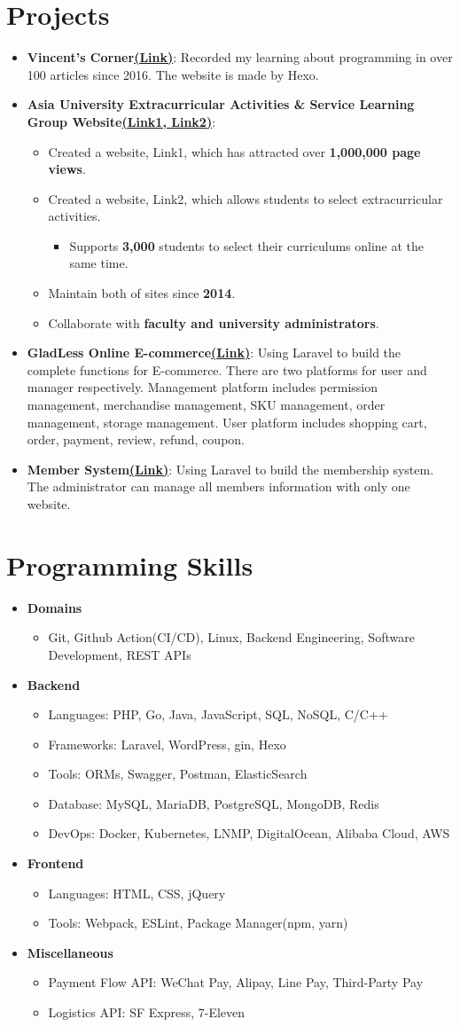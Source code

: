 \documentclass[letterpaper,11pt]{article}
\newcommand{\resumeItem}[2]{
  \item{
    \textbf{#1}{: #2 \vspace{-2pt}}
  }
}
\newcommand{\keyItem}[1]{
  \item {
      {#1 \vspace{-2pt}}
  }
}
\newcommand{\keyResultItem}[2]{
  \item {
    {#1 \vspace{-2pt}}
    \begin{itemize}
      \item {#2 \vspace{-2pt}}
    \end{itemize}
  }
}
\newcommand{\resumeSubItem}[2]{\resumeItem{#1}{#2}\vspace{-4pt}}
\newcommand{\resumeSubHeadingListStart}{\begin{itemize}[leftmargin=*]}
\newcommand{\resumeSubHeadingListEnd}{\end{itemize}}
\newcommand{\resumeItemListStart}{\begin{itemize}}
\newcommand{\resumeItemListEnd}{\end{itemize}\vspace{-5pt}}
\begin{document}
\section{Projects}
  \resumeSubHeadingListStart
    \resumeSubItem{Vincent's Corner\href{https://vincent.fishboneapps.com/}{(\underline{Link})}}
      {Recorded my learning about programming in over 100 articles since 2016. The website is made by Hexo.}
    \resumeSubItem{Asia University Extracurricular Activities \& Service Learning Group Website\href{https://sls.asia.edu.tw/}{(\underline{Link1}, }\href{https://elective.easls.asia/}{\underline{Link2})}}
      {}
      \resumeItemListStart
        \keyItem{Created a website, Link1, which has attracted over \textbf{1,000,000 page views}.}
        \keyResultItem{Created a website, Link2, which allows students to select extracurricular activities.}{Supports \textbf{3,000} students to select their curriculums online at the same time.}
        \keyItem{Maintain both of sites since \textbf{2014}.}
        \keyItem{Collaborate with \textbf{faculty and university administrators}.}
      \resumeItemListEnd
    \resumeSubItem{GladLess Online E-commerce\href{https://gladless.com/}{(\underline{Link})}}
      {Using Laravel to build the complete functions for E-commerce. There are two platforms for user and manager respectively. Management platform includes permission management, merchandise management, SKU management, order management, storage management. User platform includes shopping cart, order, payment, review, refund, coupon.}
    \resumeSubItem{Member System\href{https://member.tatcmf.org.tw/}{(\underline{Link})}}
      {Using Laravel to build the membership system. The administrator can manage all members information with only one website.}
  \resumeSubHeadingListEnd


\section{Programming Skills}
  \resumeSubHeadingListStart
    \keyItem{\textbf{Domains}}
      \resumeItemListStart
        \keyItem{Git, Github Action(CI/CD), Linux, Backend Engineering, Software Development, REST APIs}
      \resumeItemListEnd
    \keyItem{\textbf{Backend}}
      \resumeItemListStart
        \keyItem{Languages: PHP, Go, Java, JavaScript, SQL, NoSQL, C/C++}
        \keyItem{Frameworks: Laravel, WordPress, gin, Hexo}
        \keyItem{Tools: ORMs, Swagger, Postman, ElasticSearch}
        \keyItem{Database: MySQL, MariaDB, PostgreSQL, MongoDB, Redis}
        \keyItem{DevOps: Docker, Kubernetes, LNMP, DigitalOcean, Alibaba Cloud, AWS}
      \resumeItemListEnd
    \keyItem{\textbf{Frontend}}
      \resumeItemListStart
        \keyItem{Languages: HTML, CSS, jQuery}
        \keyItem{Tools: Webpack, ESLint, Package Manager(npm, yarn)}
      \resumeItemListEnd
    \keyItem{\textbf{Miscellaneous}}
      \resumeItemListStart
        \keyItem{Payment Flow API: WeChat Pay, Alipay, Line Pay, Third-Party Pay}
        \keyItem{Logistics API: SF Express, 7-Eleven}
      \resumeItemListEnd
  \resumeSubHeadingListEnd
\end{document}
